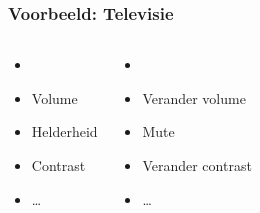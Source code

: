 \begin{frame}
  \frametitle{Voorbeeld: Televisie}
  \begin{center}
  \end{center}
  \begin{columns}[t]
    \begin{itemize}
      \item {}
      \item<2-> Volume
      \item<2-> Helderheid
      \item<2-> Contrast
      \item<2-> \dots
    \end{itemize}

    \begin{itemize}
      \item     {}
      \item<2-> Verander volume
      \item<2-> Mute
      \item<2-> Verander contrast
      \item<2-> \dots
    \end{itemize}
  \end{columns}
\end{frame}

